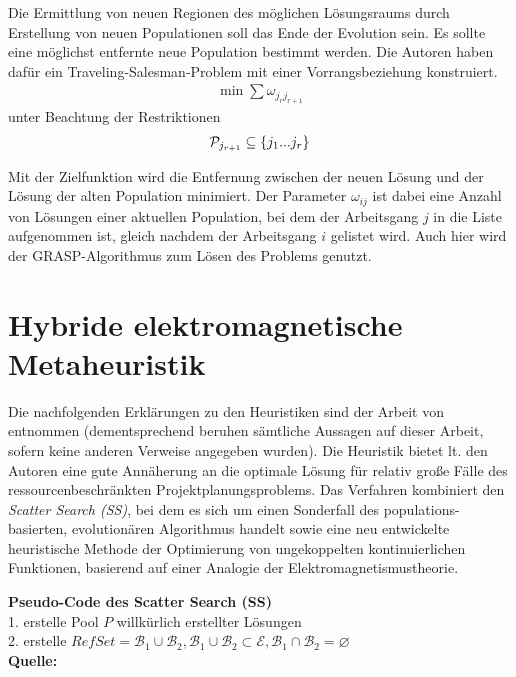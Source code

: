 \documentclass[a4paper,12pt,normalheadings,footexclude,headinclude,liststotoc,nochapterprefix,onecolumn,oneside,parskip,pointlessnumbers]{scrreprt}
\begin{document}
Die Ermittlung von neuen Regionen des möglichen Lösungsraums durch Erstellung von neuen Populationen soll das Ende der Evolution sein. Es sollte eine möglichst entfernte neue Population bestimmt werden. Die Autoren haben dafür ein Traveling-Salesman-Problem mit einer Vorrangsbeziehung konstruiert.
\begin{eqnarray} 
\min\sum \omega_{j_{r}j_{r+1}}
\end{eqnarray}
unter Beachtung der Restriktionen
\begin{multline} 
\mathcal{P}_{j_{r+1}}\subseteq \{ j_{1}...j_{r}\}
\hfill
\end{multline}\vspace{-3.0ex}

Mit der Zielfunktion wird die Entfernung zwischen der neuen Lösung und der Lösung der alten Population minimiert. Der Parameter $\omega_{ij}$ ist dabei eine Anzahl von Lösungen einer aktuellen Population, bei dem der Arbeitsgang $j$ in die Liste aufgenommen ist, gleich nachdem der Arbeitsgang $i$ gelistet wird. Auch hier wird der GRASP-Algorithmus zum Lösen des Problems genutzt.




\section{Hybride elektromagnetische Metaheuristik} \label{debels1}
Die nachfolgenden Erklärungen zu den Heuristiken sind der Arbeit von \cite{debels2006hybrid} entnommen (dementsprechend beruhen sämtliche Aussagen auf dieser Arbeit, sofern keine anderen Verweise angegeben wurden). Die Heuristik bietet lt. den Autoren eine gute Annäherung an die optimale Lösung für relativ große Fälle des ressourcenbeschränkten Projektplanungsproblems. Das Verfahren kombiniert den \textit{Scatter Search (SS)}, bei dem es sich um einen Sonderfall des populations-basierten, evolutionären Algorithmus handelt sowie eine neu entwickelte heuristische Methode der Optimierung von ungekoppelten kontinuierlichen Funktionen, basierend auf einer Analogie der Elektromagnetismustheorie.

\begin{algorithm}[H]
\textbf{Pseudo-Code des Scatter Search (SS)}\\
1. erstelle Pool $P$ willkürlich erstellter Lösungen\\
2. erstelle $RefSet=\mathcal{B}_{1}\cup \mathcal{B}_{2}, \mathcal{B}_{1}\cup \mathcal{B}_{2}\subset \mathcal{E}, \mathcal{B}_{1}\cap \mathcal{B}_{2}=\varnothing$\\
{\footnotesize \textbf{Quelle:} \cite{debels2006hybrid}}
\end{algorithm}
\end{document}
